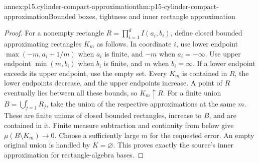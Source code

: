 \begin{annexitem}{annex:p15.cylinder-compact-approximation}{thm:p15-cylinder-compact-approximation}{Bounded boxes, tightness and inner rectangle approximation}
\begin{proof}
For a nonempty rectangle \(R=\prod_{i=1}^d I(a_i,b_i)\), define
closed bounded approximating rectangles \(K_m\) as follows. In
coordinate \(i\), use lower endpoint
\(\max(-m,a_i+1/m)\) when \(a_i\) is finite, and \(-m\)
when \(a_i=-\infty\). Use upper endpoint \(\min(m,b_i)\)
when \(b_i\) is finite, and \(m\) when \(b_i=\infty\).
If a lower endpoint exceeds its upper endpoint, use the empty set.
Every \(K_m\) is contained in \(R\), the lower endpoints
decrease, and the upper endpoints increase. A point of \(R\)
eventually lies between all these bounds, so \(K_m\uparrow R\).
For a finite union \(B=\bigcup_{j=1}^r R_j\), take the union
of the respective approximations at the same \(m\). These are
finite unions of closed bounded rectangles, increase to \(B\),
and are contained in it. Finite measure subtraction and continuity
from below give \(\mu(B\setminus K_m)\to0\). Choose a
sufficiently large \(m\) for the requested error. An empty
original union is handled by \(K=\varnothing\). This proves
exactly the source's inner approximation for rectangle-algebra bases.
\end{proof}
\end{annexitem}

